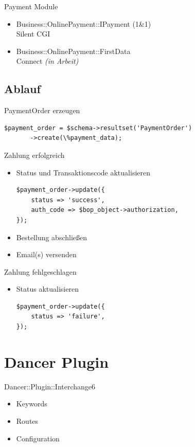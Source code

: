 \begin{frame}{Payment Module}
\begin{itemize}
\item Business::OnlinePayment::IPayment (1\&1) \\
Silent CGI
\item Business::OnlinePayment::FirstData \\
Connect \textit{(in Arbeit)}
\end{itemize}
\end{frame}

\subsection{Ablauf}
\begin{frame}[fragile]{PaymentOrder erzeugen}
\begin{lstlisting}
$payment_order = $schema->resultset('PaymentOrder')
       ->create(\%payment_data);
\end{lstlisting}
\end{frame}

\begin{frame}[fragile]{Zahlung erfolgreich}
\begin{itemize}
\item Status und Transaktionscode aktualisieren
\begin{lstlisting}
$payment_order->update({
    status => 'success',
    auth_code => $bop_object->authorization,
});
\end{lstlisting}
\item Bestellung abschließen
\item Email(s) versenden
\end{itemize}
\end{frame}

\begin{frame}[fragile]{Zahlung fehlgeschlagen}
\begin{itemize}
\item Status aktualisieren
\begin{lstlisting}
$payment_order->update({
    status => 'failure',
});
\end{lstlisting}
\end{itemize}
\end{frame}

\section{Dancer Plugin}
\begin{frame}{Dancer::Plugin::Interchange6}
\begin{itemize}
\item Keywords
\item Routes
\item Configuration
\end{itemize}
\end{frame}

